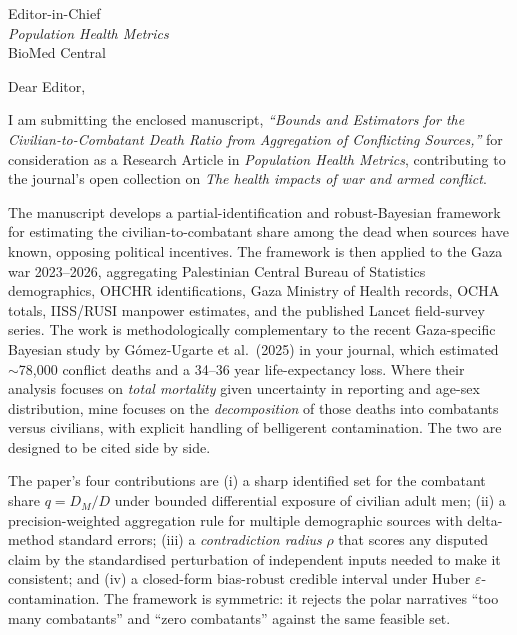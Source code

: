 \documentclass[11pt]{letter}
\begin{document}
\begin{letter}{Editor-in-Chief\\ \emph{Population Health Metrics}\\ BioMed Central}

\opening{Dear Editor,}

I am submitting the enclosed manuscript, \emph{``Bounds and Estimators for the Civilian-to-Combatant Death Ratio from Aggregation of Conflicting Sources,''} for consideration as a Research Article in \emph{Population Health Metrics}, contributing to the journal's open collection on \emph{The health impacts of war and armed conflict}.

The manuscript develops a partial-identification and robust-Bayesian framework for estimating the civilian-to-combatant share among the dead when sources have known, opposing political incentives. The framework is then applied to the Gaza war 2023--2026, aggregating Palestinian Central Bureau of Statistics demographics, OHCHR identifications, Gaza Ministry of Health records, OCHA totals, IISS/RUSI manpower estimates, and the published Lancet field-survey series. The work is methodologically complementary to the recent Gaza-specific Bayesian study by G\'{o}mez-Ugarte et al.\ (2025) in your journal, which estimated $\sim$78,000 conflict deaths and a 34--36 year life-expectancy loss. Where their analysis focuses on \emph{total mortality} given uncertainty in reporting and age-sex distribution, mine focuses on the \emph{decomposition} of those deaths into combatants versus civilians, with explicit handling of belligerent contamination. The two are designed to be cited side by side.

The paper's four contributions are (i) a sharp identified set for the combatant share $q=D_M/D$ under bounded differential exposure of civilian adult men; (ii) a precision-weighted aggregation rule for multiple demographic sources with delta-method standard errors; (iii) a \emph{contradiction radius} $\rho$ that scores any disputed claim by the standardised perturbation of independent inputs needed to make it consistent; and (iv) a closed-form bias-robust credible interval under Huber $\varepsilon$-contamination. The framework is symmetric: it rejects the polar narratives ``too many combatants'' and ``zero combatants'' against the same feasible set.


\end{letter}
\end{document}
